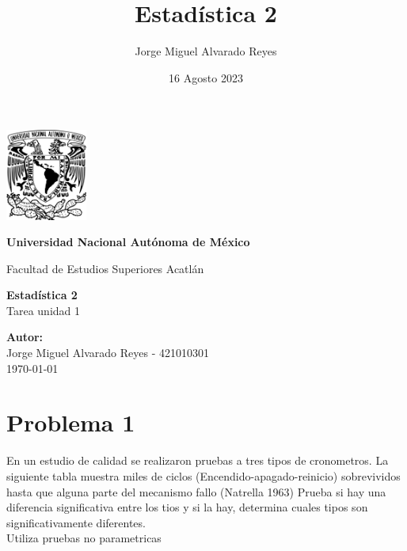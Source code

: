 \documentclass{article}
\title{Estadística 2}
\author{Jorge Miguel Alvarado Reyes}
\date{16 Agosto 2023}
\begin{document}
\begin{titlepage}
    \begin{center}
        \includegraphics[width=0.2\textwidth]{../../unam.png}
        \vspace*{.5cm}

        \LARGE
        \textbf{Universidad Nacional Autónoma de México}

        \vspace{0.5cm}
        \LARGE
        Facultad de Estudios Superiores Acatlán

        \vspace{2cm}

        \textbf{Estadística 2} \\
        Tarea unidad 1

        \vfill

        \vspace{1cm}

        \textbf{\large Autor:} \\
        Jorge Miguel Alvarado Reyes - 421010301 \\
        \vspace{.5cm}
        \normalsize \today

    \end{center}
\end{titlepage}
\newpage

\tableofcontents

\newpage

\section{Problema 1}

En un estudio de calidad se realizaron pruebas a tres tipos de cronometros. La siguiente tabla muestra miles de ciclos (Encendido-apagado-reinicio) sobrevividos hasta que alguna parte del mecanismo fallo (Natrella 1963) Prueba si hay una diferencia significativa entre los tios y si la hay, determina cuales tipos son significativamente diferentes.\\
Utiliza pruebas no parametricas
\end{document}
